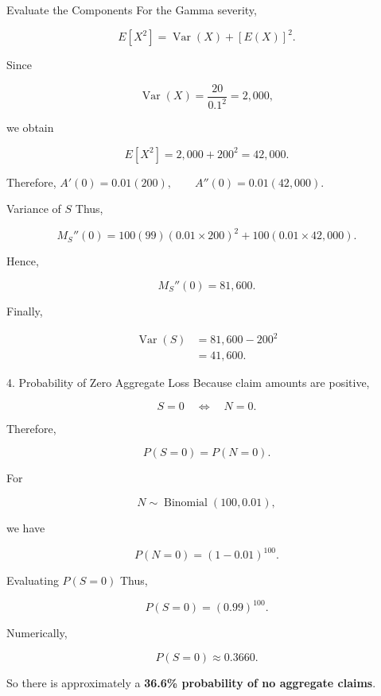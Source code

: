 \documentclass[
  ignorenonframetext,
  aspectratio=169,
]{beamer}
\begin{document}
\begin{frame}{Evaluate the Components}
\protect{}\label{evaluate-the-components}
For the Gamma severity,

\[
E[X^2]
=
\operatorname{Var}(X)+[E(X)]^2.
\]

Since

\[
\operatorname{Var}(X)=\frac{20}{0.1^2}=2{,}000,
\]

we obtain

\[
E[X^2]=2{,}000+200^2=42{,}000.
\]

Therefore, \(A'(0)=0.01(200), \qquad A''(0)=0.01(42{,}000).\)
\end{frame}

\begin{frame}{Variance of \(S\)}
\protect{}\label{variance-of-s}
Thus,

\[
M_S''(0)
=
100(99)(0.01\times200)^2
+
100(0.01\times42{,}000).
\]

Hence,

\[
M_S''(0)=81{,}600.
\]

Finally,

\[
\begin{aligned}
\operatorname{Var}(S)
&=81{,}600-200^2\\
&=\boxed{41{,}600}.
\end{aligned}
\]
\end{frame}

\begin{frame}{4. Probability of Zero Aggregate Loss}
\protect{}\label{probability-of-zero-aggregate-loss}
Because claim amounts are positive,

\[
S=0
\quad\Longleftrightarrow\quad
N=0.
\]

Therefore,

\[
P(S=0)=P(N=0).
\]

For

\[
N\sim\operatorname{Binomial}(100,0.01),
\]

we have

\[
P(N=0)
=
(1-0.01)^{100}.
\]
\end{frame}

\begin{frame}{Evaluating \(P(S=0)\)}
\protect{}\label{evaluating-ps0}
Thus,

\[
P(S=0)
=
(0.99)^{100}.
\]

Numerically,

\[
\boxed{P(S=0)\approx0.3660}.
\]

So there is approximately a \textbf{36.6\% probability of no aggregate
claims}.
\end{frame}
\end{document}
